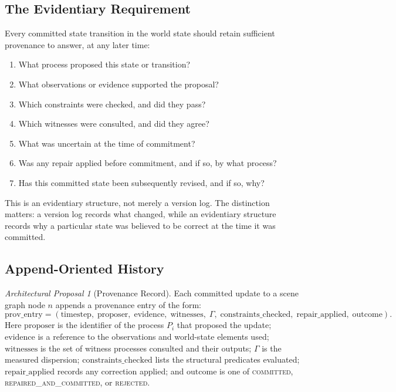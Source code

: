 \documentclass[11pt,a4paper]{article}
\theoremstyle{plain}
\theoremstyle{definition}
\theoremstyle{remark}
\newtheorem{proposal}[theorem]{Architectural Proposal}
\begin{document}
\subsection{The Evidentiary Requirement}

Every committed state transition in the world state should retain sufficient provenance to answer, at any later time:

\begin{enumerate}[leftmargin=2em,itemsep=0pt]
\item What process proposed this state or transition?
\item What observations or evidence supported the proposal?
\item Which constraints were checked, and did they pass?
\item Which witnesses were consulted, and did they agree?
\item What was uncertain at the time of commitment?
\item Was any repair applied before commitment, and if so, by what process?
\item Has this committed state been subsequently revised, and if so, why?
\end{enumerate}

This is an evidentiary structure, not merely a version log. The distinction matters: a version log records what changed, while an evidentiary structure records why a particular state was believed to be correct at the time it was committed.

\subsection{Append-Oriented History}

\begin{proposal}[Provenance Record]
Each committed update to a scene graph node $n$ appends a provenance entry of the form:
\[
\mathrm{prov\_entry} = (\mathrm{timestep},\; \mathrm{proposer},\; \mathrm{evidence},\; \mathrm{witnesses},\; \Gamma,\; \mathrm{constraints\_checked},\; \mathrm{repair\_applied},\; \mathrm{outcome}).
\]
Here $\mathrm{proposer}$ is the identifier of the process $P_i$ that proposed the update; $\mathrm{evidence}$ is a reference to the observations and world-state elements used; $\mathrm{witnesses}$ is the set of witness processes consulted and their outputs; $\Gamma$ is the measured dispersion; $\mathrm{constraints\_checked}$ lists the structural predicates evaluated; $\mathrm{repair\_applied}$ records any correction applied; and $\mathrm{outcome}$ is one of \textsc{committed}, \textsc{repaired\_and\_committed}, or \textsc{rejected}.
\end{proposal}
\end{document}
